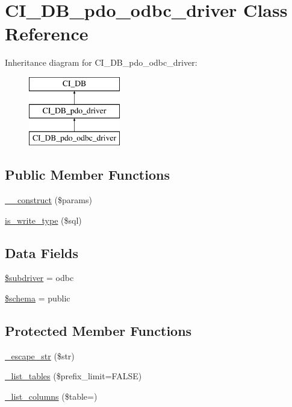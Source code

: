 \hypertarget{class_c_i___d_b__pdo__odbc__driver}{}\section{C\+I\+\_\+\+D\+B\+\_\+pdo\+\_\+odbc\+\_\+driver Class Reference}
\label{class_c_i___d_b__pdo__odbc__driver}
Inheritance diagram for C\+I\+\_\+\+D\+B\+\_\+pdo\+\_\+odbc\+\_\+driver\+:\begin{figure}[H]
\begin{center}
\leavevmode
\includegraphics[height=3.000000cm]{class_c_i___d_b__pdo__odbc__driver}
\end{center}
\end{figure}
\subsection*{Public Member Functions}
\begin{DoxyCompactItemize}
\item 
\mbox{\hyperlink{class_c_i___d_b__pdo__odbc__driver_a9162320adff1a1a4afd7f2372f753a3e}{\+\_\+\+\_\+construct}} (\$params)
\item 
\mbox{\hyperlink{class_c_i___d_b__pdo__odbc__driver_af435df5703c238769d6d16fde6d51182}{is\+\_\+write\+\_\+type}} (\$sql)
\end{DoxyCompactItemize}
\subsection*{Data Fields}
\begin{DoxyCompactItemize}
\item 
\mbox{\hyperlink{class_c_i___d_b__pdo__odbc__driver_a1322ca756348b11d080cb7a4f590de15}{\$subdriver}} = \textquotesingle{}odbc\textquotesingle{}
\item 
\mbox{\hyperlink{class_c_i___d_b__pdo__odbc__driver_a83022b1d70799d2bde3d64dca9cb40ee}{\$schema}} = \textquotesingle{}public\textquotesingle{}
\end{DoxyCompactItemize}
\subsection*{Protected Member Functions}
\begin{DoxyCompactItemize}
\item 
\mbox{\hyperlink{class_c_i___d_b__pdo__odbc__driver_af8ef0237bfcdb19215b63fff769e7a55}{\+\_\+escape\+\_\+str}} (\$str)
\item 
\mbox{\hyperlink{class_c_i___d_b__pdo__odbc__driver_a435c0f3ce54fe7daa178baa8532ebd54}{\+\_\+list\+\_\+tables}} (\$prefix\+\_\+limit=F\+A\+L\+SE)
\item 
\mbox{\hyperlink{class_c_i___d_b__pdo__odbc__driver_a7ccb7f9c301fe7f0a9db701254142b63}{\+\_\+list\+\_\+columns}} (\$table=\textquotesingle{}\textquotesingle{})
\end{DoxyCompactItemize}
